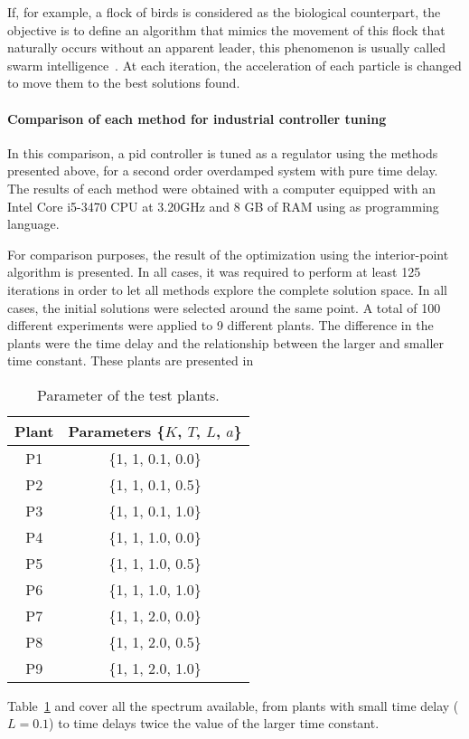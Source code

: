 If, for example, a flock of birds is considered as the biological counterpart, the objective is to define an algorithm that mimics the movement of this flock that naturally occurs without an apparent leader, this phenomenon is usually called swarm intelligence~\citep{Kennedy1995}. At each iteration, the acceleration of each particle is changed to move them to the best solutions found.

\paragraph{Comparison of each method for industrial controller tuning}
%
In this comparison, a \gls{pid} controller is tuned as a regulator using the methods presented above, for a second order overdamped system with pure time delay. The results of each method were obtained with a computer equipped with an Intel Core i5-3470 CPU at 3.20GHz and 8 GB of RAM using \matlab{} as programming language.

For comparison purposes, the result of the optimization using the interior-point algorithm is presented. In all cases, it was required to perform at least 125 iterations in order to let all methods explore the complete solution space. In all cases, the initial solutions were selected around the same point. A total of 100 different experiments were applied to 9 different plants. The difference in the plants were the time delay and the relationship between the larger and smaller time constant. These plants are presented in %
%
\begin{table}[tb]%
	\centering
	\caption{Parameter of the test plants.}
	\label{tab:Plants}
	\begin{tabular}{cc}
		\toprule
		Plant & Parameters \{$K$, $T$, $L$, $a$\}\\
		\midrule
		P1 & \{1, 1, 0.1, 0.0\}\\
		P2 & \{1, 1, 0.1, 0.5\}\\
		P3 & \{1, 1, 0.1, 1.0\}\\
		P4 & \{1, 1, 1.0, 0.0\}\\
		P5 & \{1, 1, 1.0, 0.5\}\\
		P6 & \{1, 1, 1.0, 1.0\}\\
		P7 & \{1, 1, 2.0, 0.0\}\\
		P8 & \{1, 1, 2.0, 0.5\}\\
		P9 & \{1, 1, 2.0, 1.0\}\\
		\bottomrule
	\end{tabular}
\end{table}
%
Table~\ref{tab:Plants} and cover all the spectrum available, from plants with small time delay ($L=0.1$) to time delays twice the value of the larger time constant.

